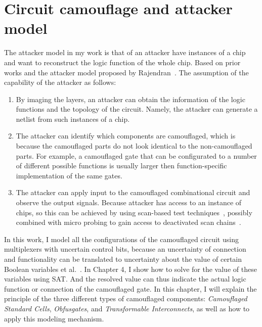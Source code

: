 \documentclass[thesis]{umassthesis}  %
\begin{document}

\chapter{Circuit camouflage and attacker model}


The attacker model in my work is that of an attacker have instances of a chip and want to reconstruct the logic function of the whole chip. Based on prior works and the attacker model proposed by Rajendran~\cite{rajendran-13}. The assumption of the capability of the attacker as follows:
\begin{enumerate}
\item By imaging the layers, an attacker can obtain the information of the logic functions and the topology of the circuit. Namely, the attacker can generate a netlist from such instances of a chip.

\item The attacker can identify which components are camouflaged, which is because the camouflaged parts do not look identical to the non-camouflaged parts. For example, a camouflaged gate that can be configurated to a number of different possible functions is usually larger then function-specific implementation of the same gates.

\item The attacker can apply input to the camouflaged combinational circuit and observe the output signals. Because attacker has access to an instance of chips, so this can be achieved by using scan-based test techniques~\cite{yang2004scan}, possibly combined with micro probing to gain access to deactivated scan chains~\cite{kommerling1999design}.
\end{enumerate}

In this work, I model all the configurations of the camouflaged circuit using multiplexers with uncertain control bits, because an uncertainty of connection and functionality can be translated to uncertainty about the value of certain Boolean variables  et al.~\cite{elmassad-15}. In Chapter 4, I show how to solve for the value of these variables using SAT. And the resolved value can thus indicate the actual logic function or connection of the camouflaged gate. In this chapter, I will explain the principle of the three different types of camouflaged components: \textit{Camouflaged Standard Cells}, \textit{Obfusgates}, and \textit{Transformable Interconnects}, as well as how to apply this modeling mechanism.
\end{document}
